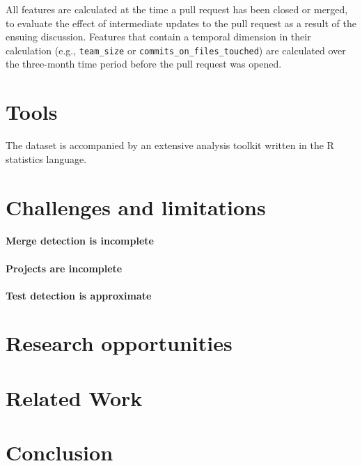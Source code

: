 \documentclass{sig-alternate}
\begin{document}
All features are calculated at the time a pull request has been closed or
merged, to evaluate the effect of intermediate updates to the pull request as a
result of the ensuing discussion. Features that contain a temporal dimension in
their calculation (e.g., \texttt{team\_size} or
\texttt{commits\_on\_files\_touched}) are calculated over the three-month time
period before the pull request was opened.



\section{Tools}

The \pullreq dataset is accompanied by an extensive analysis toolkit
written in the R statistics language.

\section{Challenges and limitations}
\label{sec:challenges}

\paragraph*{Merge detection is incomplete}

\paragraph*{Projects are incomplete}

\paragraph*{Test detection is approximate}


\section{Research opportunities}
\label{sec:discussion}

\section{Related Work}
\label{sec:rel}


\section{Conclusion}




\balance

  
\end{document}
